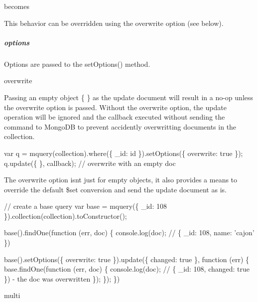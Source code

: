 becomes




This behavior can be overridden using the {\ttfamily overwrite} option (see below).

\subparagraph*{options}

Options are passed to the {\ttfamily set\+Options()} method.


\begin{DoxyItemize}
\item overwrite
\end{DoxyItemize}

Passing an empty object {\ttfamily \{ \}} as the update document will result in a no-\/op unless the {\ttfamily overwrite} option is passed. Without the {\ttfamily overwrite} option, the update operation will be ignored and the callback executed without sending the command to Mongo\+DB to prevent accidently overwritting documents in the collection.


\begin{DoxyCode}
var q = mquery(collection).where(\{ \_id: id \}).setOptions(\{ overwrite: true \});
q.update(\{ \}, callback); // overwrite with an empty doc
\end{DoxyCode}


The {\ttfamily overwrite} option isn\textquotesingle{}t just for empty objects, it also provides a means to override the default {\ttfamily \$set} conversion and send the update document as is.


\begin{DoxyCode}
// create a base query
var base = mquery(\{ \_id: 108 \}).collection(collection).toConstructor();

base().findOne(function (err, doc) \{
  console.log(doc); // \{ \_id: 108, name: 'cajon' \})

  base().setOptions(\{ overwrite: true \}).update(\{ changed: true \}, function (err) \{
    base.findOne(function (err, doc) \{
      console.log(doc); // \{ \_id: 108, changed: true \}) - the doc was overwritten
    \});
  \});
\})
\end{DoxyCode}



\begin{DoxyItemize}
\item multi
\end{DoxyItemize}

